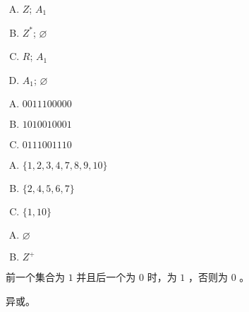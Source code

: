 {{        %
        \begin{practices}
            \begin{enumerate}[A.]
                \item $Z$; $A_1$
                \item $Z^*$; $\varnothing$
                \item $R$; $A_1$
                \item $A_1$; $\varnothing$
            \end{enumerate}
        \end{practices}

        \begin{practices}
            \begin{enumerate}[A.]
                \item $0011 1000 00$
                \item $1010 0100 01$
                \item $0111 0011 10$
            \end{enumerate}
        \end{practices}

        \begin{practices}
            \begin{enumerate}[A.]
                \item $\{1, 2, 3, 4, 7, 8, 9, 10\}$
                \item $\{2, 4, 5, 6, 7\}$
                \item $\{1, 10\}$
            \end{enumerate}
        \end{practices}

        \begin{practices}
            \begin{enumerate}[A.]
                \item $\varnothing$
                \item $Z^+$
            \end{enumerate}
        \end{practices}

        \begin{practices}
            前一个集合为 $1$ 并且后一个为 $0$ 时，为 $1$ ，否则为 $0$ 。
        \end{practices}

        \begin{practices}
            异或。
        \end{practices}

}}
